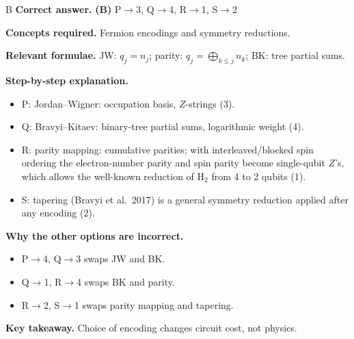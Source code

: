 \documentclass[11pt,a4paper]{article}
\newcommand{\qsep}{\par\vspace{2pt}{\color{black!15}\hrule}\vspace{4pt}}
\begin{document}
\begin{solbox}{B}
\textbf{\color{brand}Correct answer.} \textcolor{okgreen}{\textbf{(B)}} P$\to$3, Q$\to$4, R$\to$1, S$\to$2

\textbf{\color{brand}Concepts required.} Fermion encodings and symmetry reductions.

\textbf{\color{brand}Relevant formulae.} JW: $q_j = n_j$; parity: $q_j = \bigoplus_{k\le j}n_k$; BK: tree partial sums.

\textbf{\color{brand}Step-by-step explanation.} \begin{itemize}\itemsep0pt
\item P: Jordan--Wigner: occupation basis, $Z$-strings (3).
\item Q: Bravyi--Kitaev: binary-tree partial sums, logarithmic weight (4).
\item R: parity mapping: cumulative parities; with interleaved/blocked spin ordering the electron-number parity and spin parity become single-qubit
$Z$'s, which allows the well-known reduction of H$_2$ from 4 to 2 qubits (1).
\item S: tapering (Bravyi et al.\ 2017) is a general symmetry reduction applied after any encoding (2).
\end{itemize}

\textbf{\color{brand}Why the other options are incorrect.}
\begin{itemize}[leftmargin=2.4em, itemsep=1pt, topsep=2pt]
\item[\textbf{(A)}] P$\to$4, Q$\to$3 swaps JW and BK.
\item[\textbf{(C)}] Q$\to$1, R$\to$4 swaps BK and parity.
\item[\textbf{(D)}] R$\to$2, S$\to$1 swaps parity mapping and tapering.
\end{itemize}
\textbf{\color{brand}Key takeaway.} Choice of encoding changes circuit cost, not physics.
\end{solbox}
\qsep
\end{document}
